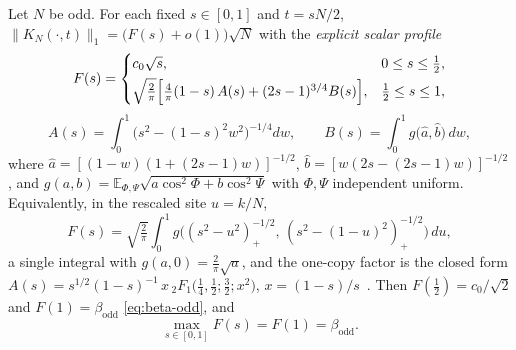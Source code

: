 \begin{proposition}\label{prop:bn-profile}
Let $N$ be odd. For each fixed $s\in[0,1]$ and $t=sN/2$,
$\|K_N(\cdot,t)\|_1=\bigl(F(s)+o(1)\bigr)\sqrt N$ with the \emph{explicit scalar profile}
\[
  F(s)=\begin{cases}
    c_0\sqrt s, & 0\le s\le\tfrac12,\\[3pt]
    \sqrt{\tfrac2\pi}\Bigl[\tfrac4\pi(1-s)\,A(s)+(2s-1)^{3/4}B(s)\Bigr], & \tfrac12\le s\le1,
  \end{cases}
\]
\[
  A(s)=\int_0^1\!\bigl(s^2-(1-s)^2w^2\bigr)^{-1/4}dw,\qquad
  B(s)=\int_0^1\! g\bigl(\widehat a,\widehat b\bigr)\,dw,
\]
where $\widehat a=[(1-w)(1+(2s-1)w)]^{-1/2}$, $\widehat b=[w(2s-(2s-1)w)]^{-1/2}$, and
$g(a,b)=\mathbb E_{\Phi,\Psi}\sqrt{a\cos^2\Phi+b\cos^2\Psi}$ with $\Phi,\Psi$ independent uniform.
Equivalently, in the rescaled site $u=k/N$,
\[
  F(s)=\sqrt{\tfrac2\pi}\int_0^1 g\bigl((s^2-u^2)_+^{-1/2},\,(s^2-(1-u)^2)_+^{-1/2}\bigr)\,du ,
\]
a single integral with $g(a,0)=\tfrac2\pi\sqrt a$, and the one-copy factor is the closed form
$A(s)=s^{1/2}(1-s)^{-1}\,x\,{}_2F_1\bigl(\tfrac14,\tfrac12;\tfrac32;x^2\bigr)$, $x=(1-s)/s$~\cite[\S15]{DLMF}.
Then $F(\tfrac12)=c_0/\sqrt2$ and $F(1)=\beta_{\mathrm{odd}}$ \eqref{eq:beta-odd}, and
\[
  \max_{s\in[0,1]}F(s)=F(1)=\beta_{\mathrm{odd}} .
\]
\end{proposition}

